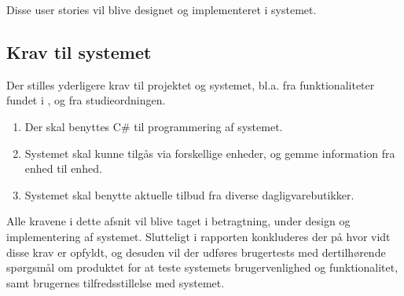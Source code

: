 Disse user stories vil blive designet og implementeret i systemet.

\subsection{Krav til systemet}

Der stilles yderligere krav til projektet og systemet, bl.a. fra funktionaliteter fundet i , og fra studieordningen.
\begin{enumerate}
\item Der skal benyttes C\# til programmering af systemet.
\item Systemet skal kunne tilgås via forskellige enheder, og gemme information fra enhed til enhed.
\item Systemet skal benytte aktuelle tilbud fra diverse dagligvarebutikker.
\end{enumerate}

Alle kravene i dette afsnit vil blive taget i betragtning, under design og implementering af systemet.
Slutteligt i rapporten konkluderes der på hvor vidt disse krav er opfyldt, og desuden vil der udføres brugertests med dertilhørende spørgsmål om produktet for at teste systemets brugervenlighed og funktionalitet, samt brugernes tilfredsstillelse med systemet.
